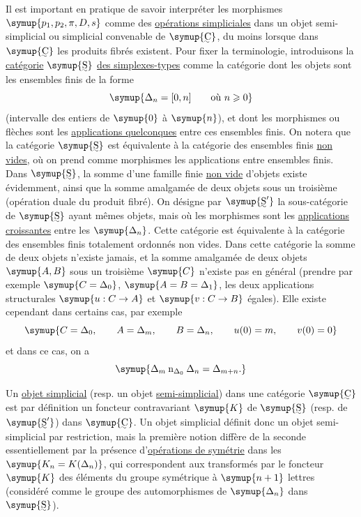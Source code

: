 Il est important en pratique de savoir interpréter les morphismes
$\symup{p_1,p_2,\pi,D,s}$ comme des \uline{opérations simpliciales} dans un objet
semi-simplicial ou simplicial convenable de $\symup{\text{\uwave{C}}}$, du moins lorsque
dans $\symup{\text{\uwave{C}}}$ les produits fibrés existent. Pour fixer la terminologie,
introduisons la \uline{catégorie} $\symup{\text{\uwave{S}}}$ \uline{des simplexes-types} comme la
catégorie dont les objets sont les ensembles finis de la forme
\[
  \symup{\Delta_n=[0,n]\qquad\text{où }n\geqslant 0}
\]
(intervalle des entiers de $\symup{0}$ à $\symup{n}$), et dont les morphismes ou flèches sont
les \uline{applications quelconques} entre ces ensembles finis. On notera que
la catégorie $\symup{\text{\uwave{S}}}$ est équivalente à la catégorie des ensembles finis
\uline{non vides}, où on prend comme morphismes les applications entre ensembles
finis. Dans $\symup{\text{\uwave{S}}}$, la somme d'une famille finie \uline{non vide} d'objets
existe évidemment, ainsi que la somme amalgamée de deux objets sous un
troisième (opération duale du produit fibré). On désigne par $\symup{\text{\uwave{S}}'}$ la
sous-catégorie de $\symup{\text{\uwave{S}}}$ ayant mêmes objets, mais où les morphismes sont
les \uline{applications croissantes} entre les $\symup{\Delta_n}$. Cette catégorie est
équivalente à la catégorie des ensembles finis totalement ordonnés non
vides. Dans cette catégorie la
somme de deux objets n'existe jamais, et la somme amalgamée de deux objets
$\symup{A,B}$ sous un troisième $\symup{C}$ n'existe pas en général (prendre par exemple
$\symup{C=\Delta_0}$, $\symup{A=B=\Delta_1}$, les deux applications structurales
$\symup{u:C\to A}$ et $\symup{v:C\to B}$ égales). Elle existe cependant dans certains cas,
par exemple
\[
  \symup{C=\Delta_0,\qquad A=\Delta_m,\qquad B=\Delta_n,\qquad
  u(0)=m,\qquad v(0)=0}
\]
et dans ce cas, on a
\[
  \symup{\Delta_m\mathbin{\mathrm{n}}_{\Delta_0}\Delta_n=\Delta_{m+n}.}
\]

Un \uline{objet simplicial} (resp. un objet \uline{semi-simplicial}) dans une
catégorie $\symup{\text{\uwave{C}}}$ est par définition un foncteur contravariant $\symup{K}$ de
$\symup{\text{\uwave{S}}}$ (resp. de $\symup{\text{\uwave{S}}'}$) dans $\symup{\text{\uwave{C}}}$. Un objet simplicial
définit donc un objet semi-simplicial par restriction, mais la première
notion diffère de la seconde essentiellement par la présence d'\uline{opérations
de symétrie} dans les $\symup{K_n=K(\Delta_n)}$, qui correspondent aux transformés
par le foncteur $\symup{K}$ des éléments du groupe symétrique à $\symup{n+1}$ lettres
(considéré comme le groupe des automorphismes de $\symup{\Delta_n}$ dans
$\symup{\text{\uwave{S}}}$).


